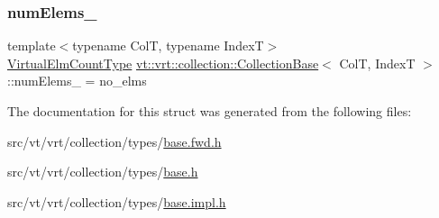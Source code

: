 \mbox{\label{structvt_1_1vrt_1_1collection_1_1_collection_base_a51c5c2114bb9b849878e384c25c4497b}} 
\subsubsection{\texorpdfstring{num\+Elems\+\_\+}{numElems\_}}
{\footnotesize\ttfamily template$<$typename ColT, typename IndexT$>$ \\
\hyperlink{namespacevt_ac115668758184050beff7a9281a2c490}{Virtual\+Elm\+Count\+Type} \hyperlink{structvt_1_1vrt_1_1collection_1_1_collection_base}{vt\+::vrt\+::collection\+::\+Collection\+Base}$<$ ColT, IndexT $>$\+::num\+Elems\+\_\+ = no\+\_\+elms\hspace{0.3cm}{\ttfamily [protected]}}



The documentation for this struct was generated from the following files\+:\begin{DoxyCompactItemize}
\item 
src/vt/vrt/collection/types/\hyperlink{base_8fwd_8h}{base.\+fwd.\+h}\item 
src/vt/vrt/collection/types/\hyperlink{collection_2types_2base_8h}{base.\+h}\item 
src/vt/vrt/collection/types/\hyperlink{base_8impl_8h}{base.\+impl.\+h}\end{DoxyCompactItemize}
